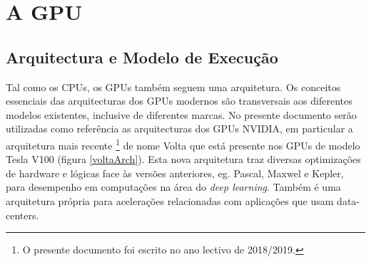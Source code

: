 \section{A GPU}
\label{gpus}

\subsection{Arquitectura e Modelo de Execução}
\label{gpuArch}
Tal como os CPUs, os GPUs também seguem uma arquitetura. Os conceitos essenciais das arquitecturas dos GPUs modernos são transversais aos diferentes modelos existentes, inclusive de diferentes marcas. No presente documento serão utilizadas como referência as arquitecturas dos GPUs NVIDIA, em particular a arquitetura mais recente \footnote[1]{O presente documento foi escrito no ano lectivo de 2018/2019.} de nome Volta\cite{voltaArch} que está presente nos GPUs de modelo Tesla V100 (figura \ref{voltaArch}). Esta nova arquitetura traz diversas optimizações de hardware e lógicas face às versões anteriores, eg. Pascal, Maxwel e Kepler, para desempenho em computações na área do \textit{deep learning}. Também é uma arquitetura própria para acelerações relacionadas com aplicações que usam data-centers.


